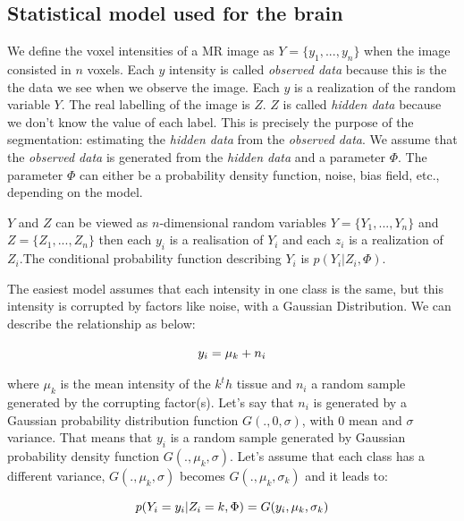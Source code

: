 \subsection{Statistical model used for the brain}
%
We define the voxel intensities of a MR image as $Y=\lbrace y_1, ..., y_n\rbrace$ when the image consisted in $n$ voxels. Each $y$ intensity is called \textit{observed data} because this is the the data we see when we observe the image. Each $y$ is a realization of the random variable $Y$. The real labelling of the image is $Z$. $Z$ is called \textit{hidden data} because we don't know the value of each label. This is precisely the purpose of the segmentation: estimating the \textit{hidden data} from the \textit{observed data}. We assume that the \textit{observed data} is generated from the \textit{hidden data} and a parameter $\Phi$. The parameter $\Phi$ can either be a probability density function, noise, bias field, etc., depending on the model.
\par
$Y$ and $Z$ can be viewed as $n$-dimensional random variables $Y=\lbrace Y_1, ..., Y_n\rbrace$ and $Z=\lbrace Z_1, ..., Z_n\rbrace$ then each $y_i$ is a realisation of $Y_i$ and each $z_i$ is a realization of $Z_i$.The conditional probability function describing $Y_i$ is $p(Y_i|Z_i,\Phi)$.
\par
The easiest model assumes that each intensity in one class is the same, but this intensity is corrupted by factors like noise,  with a Gaussian Distribution. We can describe the relationship as below:
  
  \begin{equation*}
  y_i=\mu_k+n_i\\
  \end{equation*}

\par
where $\mu_k$ is the mean intensity of the $k^th$ tissue and $n_i$ a random sample generated by the corrupting factor(s). Let's say that $n_i$ is generated by a Gaussian probability distribution function $G(.,0,\sigma)$, with $0$ mean and $\sigma$ variance. That means that $y_i$ is a random sample generated by Gaussian probability density function $G(.,\mu_k,\sigma)$. Let's assume that each class has a different variance, $G(.,\mu_k,\sigma)$ becomes $G(.,\mu_k,\sigma_k)$ and it leads to:
  
  \begin{equation}\label{CDP}
  p(Y_i=y_i|Z_i=k,\Phi)=G(y_i,\mu_k,\sigma_k)\\
  \end{equation}

